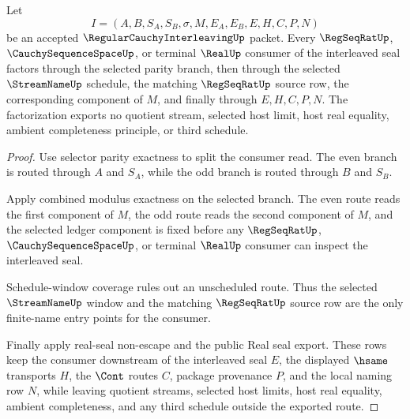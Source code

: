 \begin{theorem}
\label{thm:regular-cauchy-interleaving-regseqrat-real-consumer-factorization}
Let
$$
I=(A,B,S_A,S_B,\sigma,M,E_A,E_B,E,H,C,P,N)
$$
be an accepted $\RegularCauchyInterleavingUp$ packet. Every $\RegSeqRatUp$, $\CauchySequenceSpaceUp$, or terminal $\RealUp$ consumer of the interleaved seal factors through the selected parity branch, then through the selected $\StreamNameUp$ schedule, the matching $\RegSeqRatUp$ source row, the corresponding component of $M$, and finally through $E,H,C,P,N$. The factorization exports no quotient stream, selected host limit, host real equality, ambient completeness principle, or third schedule.
\end{theorem}
\begin{proof}
Use selector parity exactness to split the consumer read. The even branch is routed through $A$ and $S_A$, while the odd branch is routed through $B$ and $S_B$.

Apply combined modulus exactness on the selected branch. The even route reads the first component of $M$, the odd route reads the second component of $M$, and the selected ledger component is fixed before any $\RegSeqRatUp$, $\CauchySequenceSpaceUp$, or terminal $\RealUp$ consumer can inspect the interleaved seal.

Schedule-window coverage rules out an unscheduled route. Thus the selected $\StreamNameUp$ window and the matching $\RegSeqRatUp$ source row are the only finite-name entry points for the consumer.

Finally apply real-seal non-escape and the public Real seal export. These rows keep the consumer downstream of the interleaved seal $E$, the displayed $\hsame$ transports $H$, the $\Cont$ routes $C$, package provenance $P$, and the local naming row $N$, while leaving quotient streams, selected host limits, host real equality, ambient completeness, and any third schedule outside the exported route.
\end{proof}

